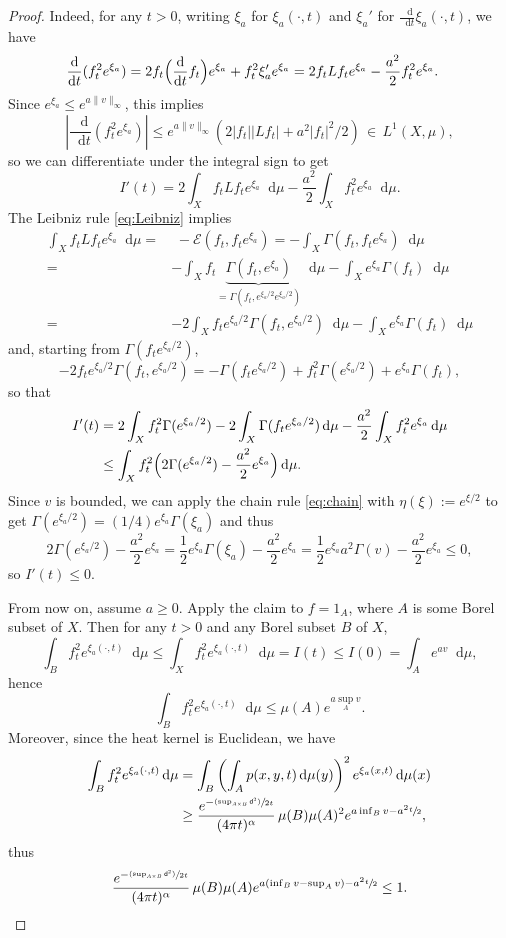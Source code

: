 \documentclass[10pt]{amsart}
\newcommand{\psfrac}[2]{\sfrac{(#1)}{#2}}
\theoremstyle{plain}
\theoremstyle{definition}
\newcommand{\cE}{\mathcal{E}}
\newcommand{\di}{\mathop{}\!\mathrm{d}}
\newcommand{\dist}{\mathsf{d}}
\begin{document}
\begin{proof}
Indeed, for any $t>0$, writing $\xi_a$ for $\xi_a(\cdot,t)$ and $\xi_a'$ for $\frac{\di}{\di t} \xi_a(\cdot,t)$, we have
\begin{align*}
\frac{\di}{\di t} (f_t^2e^{\xi_a}) & = 2 f_t \Bigl(\frac{\di}{\di t} f_t \Bigr)e^{\xi_a} + f_t^2\xi_a' e^{\xi_a} = 2 f_t Lf_t e^{\xi_a}-\frac{a^2}{2}f_t^2 e^{\xi_a}.
\end{align*}
Since $e^{\xi_a} \le e^{a \|v\|_\infty}$, this implies
\[
\left|\frac{\di}{\di t} (f_t^2e^{\xi_a}) \right| \le e^{a \|v\|_\infty}(2|f_t||Lf_t| + a^2|f_t|^2/2) \, \in \, L^1(X,\mu),
\]
so we can differentiate under the integral sign to get
\[
I'(t) = 2 \int_X f_t Lf_t e^{\xi_a} \di \mu - \frac{a^2}{2} \int_X f_t^2 e^{\xi_a} \di \mu.
\]
The Leibniz rule \eqref{eq:Leibniz} implies
\begin{align*}
\int_X f_t Lf_t e^{\xi_a} \di \mu = & \, \, - \cE(f_t,f_te^{\xi_a}) = - \int_X \Gamma(f_t,f_t e^{\xi_a}) \di \mu \\ = & - \int_X f_t \underbrace{\Gamma(f_t,e^{\xi_a})}_{=\Gamma(f_t,e^{\xi_a/2}e^{\xi_a/2})} \di \mu - \int_X e^{\xi_a} \Gamma(f_t) \di \mu\\
= & - 2 \int_X f_t e^{\xi_a/2} \Gamma(f_t,e^{\xi_a/2})\di \mu - \int_X e^{\xi_a} \Gamma(f_t) \di \mu
\end{align*}
and, starting from $\Gamma(f_te^{\xi_a/2})$,
\[
- 2 f_t e^{\xi_a/2} \Gamma(f_t,e^{\xi_a/2}) = - \Gamma(f_te^{\xi_a/2}) + f_t^2 \Gamma(e^{\xi_a/2}) + e^{\xi_a} \Gamma(f_t),
\]
so that
\begin{align*}
I'(t) & = 2 \int_X f_t^2 \Gamma(e^{\xi_a/2}) - 2 \int_X \Gamma(f_t e^{\xi_a/2})\di \mu - \frac{a^2}{2}\int_X f_t^2 e^{\xi_a} \di \mu \\ & \le \int_X f_t^2 \Bigl(2 \Gamma(e^{\xi_a/2})-\frac{a^2}{2} e^{\xi_a} \Bigr) \di \mu.
\end{align*}
Since $v$ is bounded, we can apply the chain rule \eqref{eq:chain} with $\eta(\xi):=e^{\xi/2}$ to get $\Gamma(e^{\xi_a/2})=(1/4)e^{\xi_a}\Gamma(\xi_a)$ and thus
\[
2 \Gamma(e^{\xi_a/2}) - \frac{a^2}{2}e^{\xi_a} = \frac{1}{2}e^{\xi_a}\Gamma(\xi_a) - \frac{a^2}{2}e^{\xi_a} = \frac{1}{2}e^{\xi_a} a^2 \Gamma(v)-\frac{a^2}{2}e^{\xi_a}\le 0,
\]
so $I'(t) \le 0$.

From now on, assume $a \ge 0$. Apply the claim to $f=1_A$, where $A$ is some Borel subset of $X$. Then for any $t>0$ and any Borel subset $B$ of $X$,
\[
\int_B f_t^2 e^{\xi_a(\cdot,t)} \di \mu \le \int_X f_t^2 e^{\xi_a(\cdot,t)} \di \mu =I(t)\le I(0) = \int_{A} e^{a v} \di \mu,
\]
hence
\[
\int_B f_t^2 e^{\xi_a(\cdot,t)} \di \mu \le \mu(A) e^{a \sup_A v}.
\]
Moreover, since the heat kernel is Euclidean, we have
\begin{align*}
\int_B f_t^2 e^{\xi_a(\cdot,t)} \di \mu & = \int_{B} \left(\int_A p(x,y,t) \di \mu(y)\right)^2 e^{\xi_a(x,t)} \di \mu(x)\\ & \ge \frac{e^{-\psfrac{\sup_{A\times B} \dist^2}{2t}}}{(4\pi t)^\alpha}\, \mu(B) \mu(A)^2 e^{a \inf_B v - a^2 \sfrac{t}{2}},
\end{align*}
thus
\[
\frac{e^{-\psfrac{\sup_{A\times B} \dist^2}{2t}}}{(4\pi t)^\alpha}\, \mu(B) \mu(A) e^{a (\inf_B v - \sup_A v) - a^2 \sfrac{t}{2}} \le 1.
\]


\end{proof}
\end{document}
